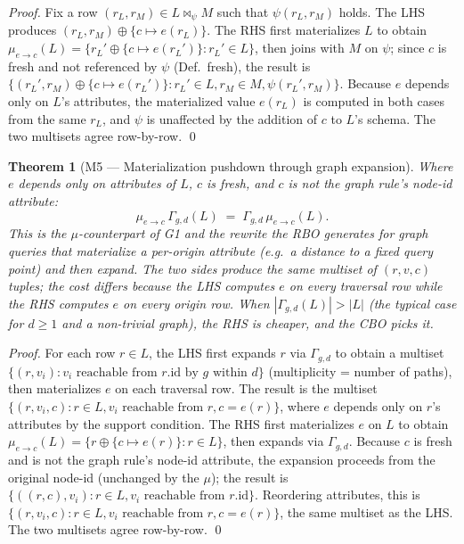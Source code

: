 \documentclass[sigconf,nonacm,review]{acmart}
\theoremstyle{plain}
\newtheorem{theorem}{Theorem}
\theoremstyle{definition}
\theoremstyle{remark}
\begin{document}
\begin{proof}
Fix a row $(r_L, r_M) \in L \bowtie_\psi M$ such that
$\psi(r_L, r_M)$ holds. The LHS produces
$(r_L, r_M) \oplus \{c \mapsto e(r_L)\}$. The RHS first
materializes $L$ to obtain
$\mu_{e \to c}(L) = \{r_L' \oplus \{c \mapsto e(r_L')\} : r_L' \in L\}$,
then joins with $M$ on $\psi$; since $c$ is fresh and not referenced
by $\psi$ (Def.~fresh), the result is
$\{ (r_L', r_M) \oplus \{c \mapsto e(r_L')\} : r_L' \in L, r_M \in M,
\psi(r_L', r_M) \}$. Because $e$ depends only on $L$'s attributes,
the materialized value $e(r_L)$ is computed in both cases from
the same $r_L$, and $\psi$ is unaffected by the addition of $c$ to
$L$'s schema. The two multisets agree row-by-row. \qed
\end{proof}

\begin{theorem}[M5 --- Materialization pushdown through graph expansion]\label{thm:m5}
Where $e$ depends only on attributes of $L$, $c$ is fresh, and $c$
is not the graph rule's node-id attribute:
\[
\mu_{e \to c}\, \Gamma_{g, d}(L)
\;=\;
\Gamma_{g, d}\, \mu_{e \to c}(L).
\]
This is the $\mu$-counterpart of G1 and the rewrite the RBO
generates for graph queries that materialize a per-origin attribute
(e.g.\ a distance to a fixed query point) and then expand. The
two sides produce the same multiset of $(r, v, c)$ tuples; the
cost differs because the LHS computes $e$ on every traversal row
while the RHS computes $e$ on every origin row. When
$|\Gamma_{g,d}(L)| > |L|$ (the typical case for $d \geq 1$ and a
non-trivial graph), the RHS is cheaper, and the CBO picks it.
\end{theorem}

\begin{proof}
For each row $r \in L$, the LHS first expands $r$ via $\Gamma_{g,d}$
to obtain a multiset $\{(r, v_i) : v_i \text{ reachable from } r
\text{.id by } g \text{ within } d\}$ (multiplicity = number of
paths), then materializes $e$ on each traversal row. The result is
the multiset $\{(r, v_i, c) : r \in L, v_i \text{ reachable from } r,
c = e(r)\}$, where $e$ depends only on $r$'s attributes by the
support condition. The RHS first materializes $e$ on $L$ to obtain
$\mu_{e \to c}(L) = \{r \oplus \{c \mapsto e(r)\} : r \in L\}$, then
expands via $\Gamma_{g,d}$. Because $c$ is fresh and is not the
graph rule's node-id attribute, the expansion proceeds from the
original node-id (unchanged by the $\mu$); the result is
$\{((r, c), v_i) : r \in L, v_i \text{ reachable from } r\text{.id}\}$.
Reordering attributes, this is
$\{(r, v_i, c) : r \in L, v_i \text{ reachable from } r, c = e(r)\}$,
the same multiset as the LHS. The two multisets agree row-by-row.
\qed
\end{proof}
\end{document}
